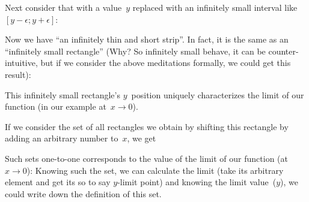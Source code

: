 \documentclass{amsart}
\begin{document}
Next consider that with a value~$y$ replaced with an infinitely small interval like $[y-\epsilon;y+\epsilon]$:
\begin{figure}[H]
\end{figure}

Now we have ``an infinitely thin and short strip''. In fact, it is the same as an ``infinitely small rectangle'' (Why? So infinitely small behave, it can be counter-intuitive, but if we consider the above meditations formally, we could get this result):
\begin{figure}[H]
\end{figure}

This infinitely small rectangle's $y$~position uniquely characterizes the limit of our function (in our example at~$x\to 0$).

If we consider the set of all rectangles we obtain by shifting this rectangle by adding an arbitrary number to~$x$, we get
\begin{figure}[H]
\end{figure}
Such sets one-to-one corresponds to the value of the limit of our function (at $x\to 0$): Knowing such the set, we can calculate the limit (take its arbitrary element and get its so to say $y$-limit point) and knowing the limit value~($y$), we could write down the definition of this set.
\end{document}
